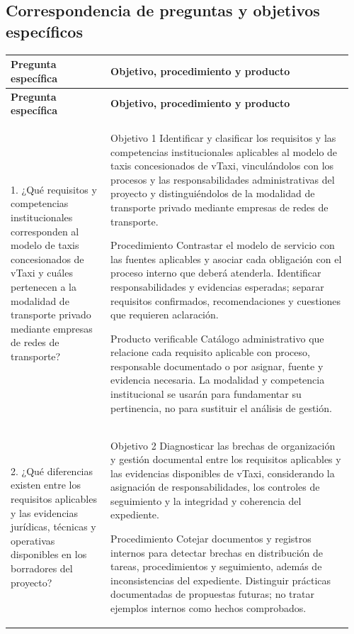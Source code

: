 {\begin{landscape}
\subsection*{Correspondencia de preguntas y objetivos específicos}
\begingroup\small{}
\setlength{\tabcolsep}{6pt}
\renewcommand{\arraystretch}{1.2}
\begin{longtable}{@{}p{0.28\linewidth}p{0.68\linewidth}@{}}
\toprule
\textbf{Pregunta específica} & \textbf{Objetivo, procedimiento y producto}\\
\midrule\endfirsthead
\toprule
\textbf{Pregunta específica} & \textbf{Objetivo, procedimiento y producto}\\
\midrule\endhead
1. ¿Qué requisitos y competencias institucionales corresponden al modelo de taxis concesionados de vTaxi y cuáles pertenecen a la modalidad de transporte privado mediante empresas de redes de transporte? & Objetivo 1
Identificar y clasificar los requisitos y las competencias institucionales aplicables al modelo de taxis concesionados de vTaxi, vinculándolos con los procesos y las responsabilidades administrativas del proyecto y distinguiéndolos de la modalidad de transporte privado mediante empresas de redes de transporte.

Procedimiento
Contrastar el modelo de servicio con las fuentes aplicables y asociar cada obligación con el proceso interno que deberá atenderla. Identificar responsabilidades y evidencias esperadas; separar requisitos confirmados, recomendaciones y cuestiones que requieren aclaración.

Producto verificable
Catálogo administrativo que relacione cada requisito aplicable con proceso, responsable documentado o por asignar, fuente y evidencia necesaria. La modalidad y competencia institucional se usarán para fundamentar su pertinencia, no para sustituir el análisis de gestión.\\
\midrule
2. ¿Qué diferencias existen entre los requisitos aplicables y las evidencias jurídicas, técnicas y operativas disponibles en los borradores del proyecto? & Objetivo 2
Diagnosticar las brechas de organización y gestión documental entre los requisitos aplicables y las evidencias disponibles de vTaxi, considerando la asignación de responsabilidades, los controles de seguimiento y la integridad y coherencia del expediente.

Procedimiento
Cotejar documentos y registros internos para detectar brechas en distribución de tareas, procedimientos y seguimiento, además de inconsistencias del expediente. Distinguir prácticas documentadas de propuestas futuras; no tratar ejemplos internos como hechos comprobados.


\end{longtable}
\end{landscape}}
